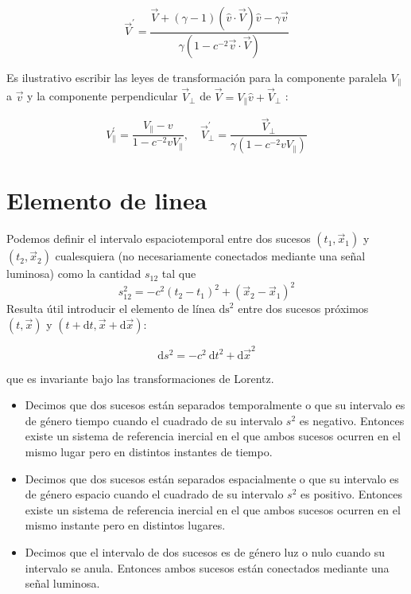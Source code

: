 \[\vec{V}^{\prime}=\frac{\vec{V}+(\gamma-1)(\hat{v} \cdot \vec{V}) \hat{v}-\gamma \vec{v}}{\gamma\left(1-c^{-2} \vec{v} \cdot \vec{V}\right)}\]


Es ilustrativo escribir las leyes de transformación para la componente paralela $V_{\|}$a $\vec{v}$ y la componente perpendicular $\vec{V}_{\perp}$ de $\vec{V}=V_{\|} \hat{v}+\vec{V}_{\perp}$ :

\[V_{\|}^{\prime}=\frac{V_{\|}-v}{1-c^{-2} v V_{\|}}, \quad \vec{V}_{\perp}^{\prime}=\frac{\vec{V}_{\perp}}{\gamma\left(1-c^{-2} v V_{\|}\right)}\]

\section{Elemento de linea}

Podemos definir el intervalo espaciotemporal entre dos sucesos $\left(t_{1}, \vec{x}_{1}\right)$ y $\left(t_{2}, \vec{x}_{2}\right)$ cualesquiera (no necesariamente conectados mediante una señal luminosa) como la cantidad $s_{12}$ tal que
\[s_{12}^{2}=-c^{2}\left(t_{2}-t_{1}\right)^{2}+\left(\vec{x}_{2}-\vec{x}_{1}\right)^{2}\]
Resulta útil introducir el elemento de línea $\mathrm{ds}^{2}$ entre dos sucesos próximos $(t, \vec{x})$ y $(t+\mathrm{d} t, \vec{x}+\mathrm{d} \vec{x}):$

\[\mathrm{d} s^{2}=-c^{2} \mathrm{~d} t^{2}+\mathrm{d} \vec{x}^{2}\]

que es invariante bajo las transformaciones de Lorentz.

\begin{itemize}
  \item Decimos que dos sucesos están separados temporalmente o que su intervalo es de género tiempo cuando el cuadrado de su intervalo $s^{2}$ es negativo. Entonces existe un sistema de referencia inercial en el que ambos sucesos ocurren en el mismo lugar pero en distintos instantes de tiempo.
  \item Decimos que dos sucesos están separados espacialmente o que su intervalo es de género espacio cuando el cuadrado de su intervalo $s^{2}$ es positivo. Entonces existe un sistema de referencia inercial en el que ambos sucesos ocurren en el mismo instante pero en distintos lugares. 
  \item Decimos que el intervalo de dos sucesos es de género luz o nulo cuando su intervalo se anula. Entonces ambos sucesos están conectados mediante una señal luminosa.
\end{itemize}

